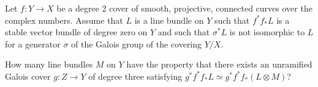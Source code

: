 Let $f: Y \to X$ be a degree 2 cover of smooth, projective, connected curves over the complex numbers. Assume that $L$ is a line bundle on $Y$ such that $f^\ast f_\ast L$ is a stable vector bundle of degree zero on $Y$ and such that $\sigma^\ast L$ is not isomorphic to $L$ for a generator $\sigma$ of the Galois group of the covering $Y/X$.

How many line bundles $M$ on $Y$ have the property that there exists an unramified Galois cover $g: Z \to Y$ of degree three satisfying $g^\ast f^\ast f_\ast L \simeq g^\ast f^\ast f_\ast (L \otimes M)$?
